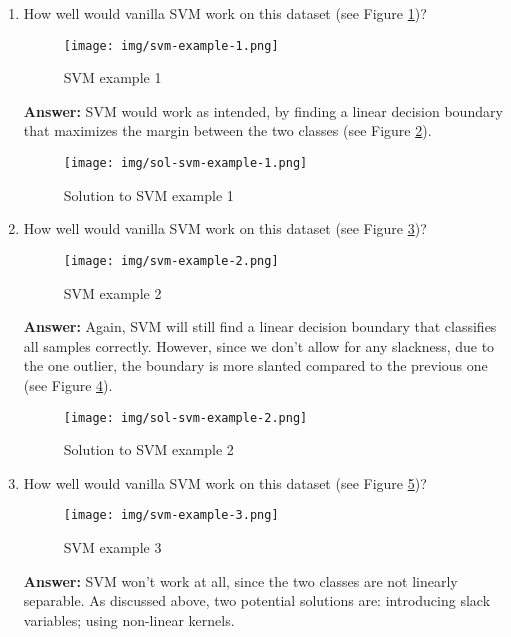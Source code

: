 \documentclass{article}
\newenvironment{QandA}{\begin{enumerate}[label=\arabic*.]}{\end{enumerate}}
\newenvironment{InnerQandA}{\begin{enumerate}[label=\roman*.]}{\end{enumerate}}
\newenvironment{answer}{\par\normalfont \textbf{Answer:}}{}
\begin{document}
\begin{QandA}
\begin{InnerQandA}
        \item How well would vanilla SVM work on this dataset (see Figure \ref{fig:svm-example-1})?
        \begin{figure}[htb!]
            \centering
            \texttt{[image: img/svm-example-1.png]}
            \caption{SVM example 1}
            \label{fig:svm-example-1}
        \end{figure}
        \begin{answer}
            SVM would work as intended, by finding a linear decision boundary that maximizes the margin between the two classes (see Figure \ref{fig:-sol-svm-example-1}).
            \begin{figure}[htb!]
                \centering
                \texttt{[image: img/sol-svm-example-1.png]}
                \caption{Solution to SVM example 1}
                \label{fig:-sol-svm-example-1}
            \end{figure}
        \end{answer}

        \item How well would vanilla SVM work on this dataset (see Figure \ref{fig:svm-example-2})?
        \begin{figure}[htb!]
            \centering
            \texttt{[image: img/svm-example-2.png]}
            \caption{SVM example 2}
            \label{fig:svm-example-2}
        \end{figure}
        \begin{answer}
            Again, SVM will still find a linear decision boundary that classifies all samples correctly. However, since we don't allow for any slackness, due to the one outlier, the boundary is more slanted compared to the previous one (see Figure \ref{fig:-sol-svm-example-2}). 
            \begin{figure}[htb!]
                \centering
                \texttt{[image: img/sol-svm-example-2.png]}
                \caption{Solution to SVM example 2}
                \label{fig:-sol-svm-example-2}
            \end{figure}
        \end{answer}

        \item How well would vanilla SVM work on this dataset (see Figure \ref{fig:svm-example-3})?
        \begin{figure}[htb!]
            \centering
            \texttt{[image: img/svm-example-3.png]}
            \caption{SVM example 3}
            \label{fig:svm-example-3}
        \end{figure}
        \begin{answer}
            SVM won't work at all, since the two classes are not linearly separable. As discussed above, two potential solutions are: introducing slack variables; using non-linear kernels.
        \end{answer}
    \end{InnerQandA}
    
\end{QandA}
\end{document}
